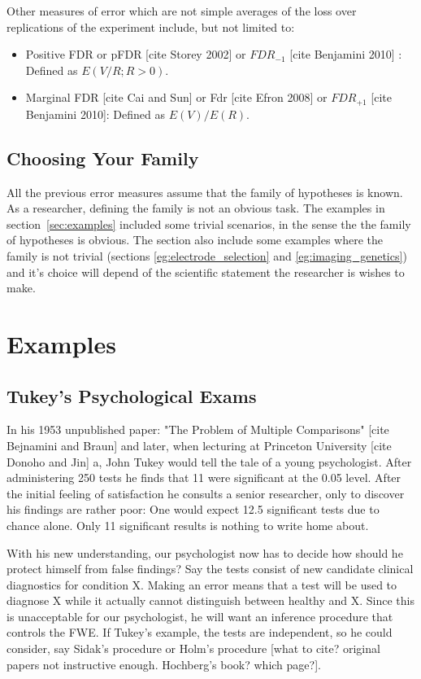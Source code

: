 \documentclass[draft,12pt]{article}
\begin{document}
Other measures of error which are not simple averages of the loss over replications of the experiment include, but not limited to:
\begin{itemize}
\item Positive FDR or pFDR [cite Storey 2002] or $FDR_{-1}$ [cite Benjamini 2010] : Defined as $E(V/R;R>0)$.
\item Marginal FDR [cite Cai and Sun] or Fdr [cite Efron 2008] or $FDR_{+1}$ [cite Benjamini 2010]: Defined as $E(V)/E(R)$.
\end{itemize}




\subsection{Choosing Your Family}
All the previous error measures assume that the family of hypotheses is known. As a researcher, defining the family is not an obvious task. The examples in section~\ref{sec:examples} included some trivial scenarios, in the sense the the family of hypotheses is obvious. The section also include some examples where the family is not trivial (sections \ref{eg:electrode_selection} and \ref{eg:imaging_genetics}) and it's choice will depend of the scientific statement the researcher is wishes to make.




\section{\label{sec:examples}Examples}



\subsection{Tukey's Psychological Exams}
In his 1953 unpublished paper: "The Problem of Multiple Comparisons" [cite Bejnamini and Braun] and later, when lecturing at Princeton University [cite Donoho and Jin] a, John Tukey would tell the tale of a young psychologist. After administering 250 tests he finds that 11 were significant at the 0.05 level. After the initial feeling of satisfaction he consults a senior researcher, only to discover his findings are rather poor: One would expect 12.5 significant tests due to chance alone. Only 11 significant results is nothing to write home about.


With his new understanding, our psychologist now has to decide how should he protect himself from false findings? 
Say the tests consist of new candidate clinical diagnostics for condition X. Making an error means that a test will be used to diagnose X while it actually cannot distinguish between healthy and X. Since this is unacceptable for our psychologist, he will want an inference procedure that controls the FWE. If Tukey's example, the tests are independent, so he could consider, say Sidak's procedure or Holm's procedure [what to cite? original papers not instructive enough. Hochberg's book? which page?].
\end{document}
